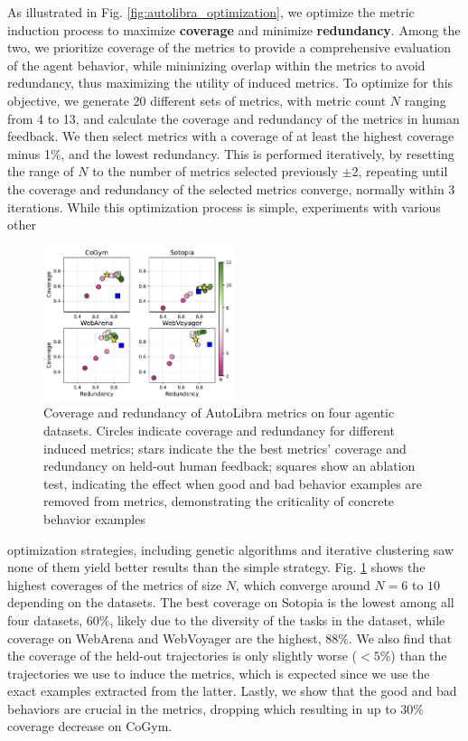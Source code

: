 As illustrated in Fig. \ref{fig:autolibra_optimization}, we optimize the metric
induction process to maximize \textbf{coverage} and minimize \textbf{redundancy}.
Among the two, we prioritize coverage of the metrics to provide a comprehensive
evaluation of the agent behavior, while minimizing overlap within the metrics to
avoid redundancy, thus maximizing the utility of induced metrics. To optimize for
this objective, we generate 20 different sets of metrics, with metric count $N$ ranging from 4
to 13, and calculate the coverage and redundancy of the metrics in human
feedback.
We then select metrics with a coverage of at least the highest coverage minus 1\%,
and the lowest redundancy. This is performed iteratively, by resetting the range
of $N$ to the number of metrics selected previously $\pm$2, repeating until the coverage
and redundancy of the selected metrics converge, normally within 3 iterations. While
this optimization process is simple, experiments with various other  \begin{figure}
	\vspace{-10pt}
	\includegraphics[width=0.5\textwidth]{figs/four_datasets_grid.pdf}
	\vspace{-15pt}
	\caption{Coverage and redundancy of AutoLibra metrics on four agentic datasets.
		Circles indicate coverage and redundancy for different induced metrics; stars
		indicate the the best metrics' coverage and redundancy on held-out human feedback;
		squares show an ablation test, indicating the effect when good and bad behavior
		examples are removed from metrics, demonstrating the criticality of concrete
		behavior examples}
	\label{fig:coverage-redundancy}
\end{figure}optimization
strategies, including genetic algorithms and iterative clustering saw none of them
yield better results than the simple strategy. Fig. \ref{fig:coverage-redundancy} 
shows the highest coverages of the metrics of size $N$, which converge around
$N=6$ to $10$ depending on the datasets. The best coverage on Sotopia \citep{zhousotopia}
is the lowest among all four datasets, $60\%$, likely due to the diversity of
the tasks in the dataset, while coverage on WebArena \citep{zhouwebarena} and
WebVoyager \citep{he2024webvoyager} are the highest, $88\%$. We also find that the
coverage of the held-out trajectories is only slightly worse ($<5\%$) than the trajectories
we use to induce the metrics, which is expected since we use the exact examples
extracted from the latter. Lastly, we show that the good and bad behaviors are
crucial in the metrics, dropping which resulting in up to $30\%$ coverage decrease on CoGym. %


